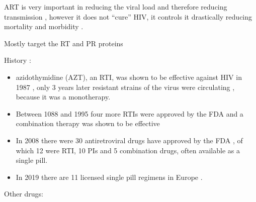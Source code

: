 \documentclass[
  11pt,
  twoside]{scrbook}
\begin{document}
ART is very important in reducing the viral load and therefore reducing transmission \autocite{eisingerHIVViralLoad2019}, however it does not ``cure'' HIV, it controls it drastically reducing mortality and morbidity \autocite{palellaDecliningMorbidityMortality1998}.

Mostly target the RT and PR proteins

History \autocite{zolopaEvolutionHIVTreatment2010,forsytheTwentyYearsAntiretroviral2019}:

\begin{itemize}
\item
  azidothymidine (AZT), an RTI, was shown to be effective against HIV in 1987 \autocite{fischlEfficacyAzidothymidineAZT1987}, only 3 years later resistant strains of the virus were circulating \autocite{richmanSusceptibilityNucleosideAnalogues1990}, because it was a monotherapy.
\item
  Between 1088 and 1995 four more RTIs were approved by the FDA and a combination therapy was shown to be effective \autocite{gulickTreatmentIndinavirZidovudine1997}
\item
  In 2008 there were 30 antiretroviral drugs have approved by the FDA \autocite{palmisanoBriefHistoryAntiretroviral2011}, of which 12 were RTI, 10 PIs and 5 combination drugs, often available as a single pill.
\item
  In 2019 there are 11 licensed single pill regimens in Europe \autocite{OnepilladayHIVTreatments}.
\end{itemize}

Other drugs:
\end{document}
